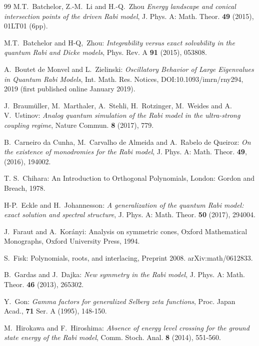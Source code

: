 \documentclass[11pt]{article}
\numberwithin{equation}{section}
\theoremstyle{plain}
\theoremstyle{definition}
\theoremstyle{remark}
\begin{document}
\begin{thebibliography}{99}
M.T.~Batchelor, Z.-M.~Li and H.-Q.~Zhou
\textit{Energy landscape and conical intersection points of the driven Rabi model},
J. Phys. A: Math. Theor. \textbf{49} (2015), 01LT01 (6pp).

  M.T.~Batchelor and H-Q,~Zhou:
  \textit{Integrability versus exact solvability in the quantum Rabi and Dicke models},
  Phys. Rev. A \textbf{91} (2015), 053808.

  A.~Boutet de Monvel and L.~Zielinski:
  \textit{Oscillatory Behavior of Large Eigenvalues in Quantum Rabi Models}, Int. Math. Res. Notices, 
  DOI:10.1093/imrn/rny294, 2019 (first published online January 2019).
  
J.~Braum\"uller, M.~Marthaler, A.~Stehli, H.~Rotzinger, M.~Weides and A. V.~Ustinov:
\textit{Analog quantum simulation of the Rabi model in the ultra-strong coupling regime},
Nature Commun. \textbf{8} (2017), 779.

  B.~Carneiro da Cunha, M.~Carvalho de Almeida and A.~Rabelo de Queiroz:
  \textit{On the existence of monodromies for the Rabi model},
  J. Phys. A: Math. Theor. \textbf{49}, (2016), 194002.

  T. S.~Chihara:
  An Introduction to Orthogonal Polynomials, London: Gordon and Breach, 1978.

H-P.~Eckle and H.~Johannesson:
\textit{A generalization of the quantum Rabi model: exact solution and spectral structure},
J. Phys. A: Math. Theor. \textbf{50} (2017), 294004.
  
  J.~Faraut and A.~Kor\'anyi: Analysis on symmetric cones, Oxford Mathematical Monographs,
  Oxford University Press, 1994.
  
  S.~Fisk:
  Polynomials, roots, and interlacing,
  Preprint 2008. arXiv:math/0612833.
  
  B.~Gardas and J.~Dajka:
  \textit{New symmetry in the Rabi model},
J. Phys. A: Math. Theor. \textbf{46} (2013), 265302.

  Y.~Gon:
 \textit{Gamma factors for generalized Selberg zeta functions}, Proc.
  Japan Acad., \textbf{71} Ser. A (1995), 148-150.

  M.~Hirokawa and F.~Hiroshima:
  \textit{Absence of energy level crossing for the ground state energy of the Rabi model},
  Comm. Stoch. Anal. \textbf{8} (2014), 551-560.


\end{thebibliography}
\end{document}
